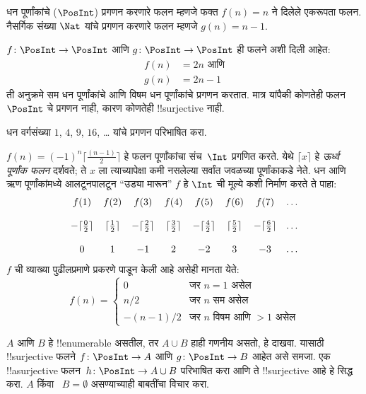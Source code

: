 \documentclass[../../../include/open-logic-section]{subfiles}
\begin{document}
\begin{ex}
धन पूर्णांकांचे ($\PosInt$) प्रगणन करणारे फलन म्हणजे फक्त
$f(n) = n$ ने दिलेले एकरूपता फलन. नैसर्गिक संख्या $\Nat$ यांचे
प्रगणन करणारे फलन म्हणजे $g(n) = n - 1$.
\end{ex}

\begin{ex}
$f\colon \PosInt \to \PosInt$ आणि $g \colon \PosInt \to \PosInt$
ही फलने अशी दिली आहेत:
\begin{align*}
f(n) & = 2n \text{ आणि}\\
g(n) & = 2n - 1
\end{align*}
ती अनुक्रमे सम धन पूर्णांकांचे आणि विषम धन पूर्णांकांचे प्रगणन करतात.
मात्र यांपैकी कोणतेही फलन $\PosInt$ चे प्रगणन नाही, कारण कोणतेही
!!{surjective} नाही.
\end{ex}

\begin{prob}
धन वर्गसंख्या $1$, $4$, $9$, $16$, \dots{} यांचे प्रगणन परिभाषित करा.
\end{prob}

\begin{ex}
$f(n) = (-1)^{n} \lceil \frac{(n-1)}{2}\rceil$ हे फलन पूर्णांकांचा
संच~$\Int$ प्रगणित करते. येथे $\lceil x \rceil$ हे
\emph{ऊर्ध्व पूर्णांक फलन} दर्शवते; ते $x$ ला त्याच्यापेक्षा कमी
नसलेल्या सर्वांत जवळच्या पूर्णांकाकडे नेते. धन आणि ऋण पूर्णांकांमध्ये
आलटूनपालटून ``उड्या मारून'' $f$ हे $\Int$ ची मूल्ये कशी निर्माण
करते ते पाहा:
\[
\begin{array}{c c c c c c c c}
f(1) & f(2) & f(3) & f(4) & f(5) & f(6) & f(7) & \dots \\ \\
- \lceil \tfrac{0}{2} \rceil & \lceil \tfrac{1}{2}\rceil & - \lceil \tfrac{2}{2} \rceil & \lceil \tfrac{3}{2} \rceil & - \lceil \tfrac{4}{2} \rceil  & \lceil \tfrac{5}{2}
\rceil & - \lceil \tfrac{6}{2} \rceil & \dots \\ \\
0 & 1 & -1 & 2 & -2 & 3 & -3 & \dots
\end{array}
\]
%
$f$ ची व्याख्या पुढीलप्रमाणे प्रकरणे पाडून केली आहे असेही मानता येते:
\[
f(n) = \begin{cases}
  0 & \text{जर $n = 1$ असेल}\\
  n/2 & \text{जर $n$ सम असेल}\\
  -(n-1)/2 & \text{जर $n$ विषम आणि $>1$ असेल}
  \end{cases}
\]
\end{ex}

\begin{prob}
  $A$ आणि $B$ हे !!{enumerable} असतील, तर $A \cup B$ हाही
  गणनीय असतो, हे दाखवा. यासाठी !!{surjective} फलने
  $f\colon \PosInt \to A$ आणि $g\colon \PosInt \to B$ आहेत असे
  समजा. एक !!a{surjective} फलन~$h\colon \PosInt \to A \cup B$
  परिभाषित करा आणि ते !!{surjective} आहे हे सिद्ध करा. $A$ किंवा
  ~$B = \emptyset$ असण्याच्याही बाबतींचा विचार करा.
\end{prob}
\end{document}
